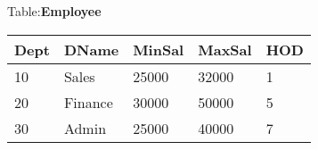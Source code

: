 \documentclass[
a4paper]{article}
\begin{document}
\begin{large}
\begin{center}
			Table:\textbf{Employee}
			\vspace{0.5cm}
			
			\begin{tabular}{|l|l|l|l|l|}
				\hline
				\textbf{Dept} & \textbf{DName} & \textbf{MinSal} & \textbf{MaxSal} & \textbf{HOD} \\ \hline
				10            & Sales          & 25000           & 32000           & 1            \\ \hline
				20            & Finance        & 30000           & 50000           & 5            \\ \hline
				30            & Admin          & 25000           & 40000           & 7            \\ \hline
			\end{tabular}
			
			\vspace{0.5cm}
			

\end{center}
\end{large}
\end{document}
